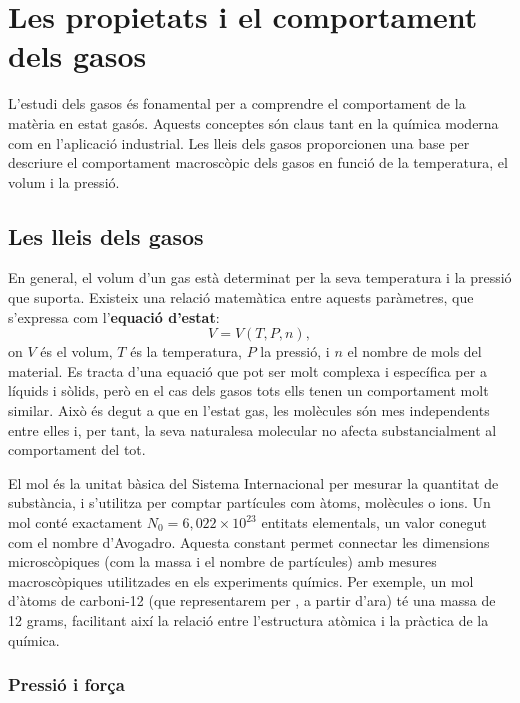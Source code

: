 \chapter{Les propietats i el comportament dels gasos}

L'estudi dels gasos és fonamental per a comprendre el comportament de la matèria en estat gasós. Aquests conceptes són claus tant en la química moderna com en l'aplicació industrial. Les lleis dels gasos proporcionen una base per descriure el comportament macroscòpic dels gasos en funció de la temperatura, el volum i la pressió.



\section{Les lleis dels gasos}
En general, el volum d'un gas està determinat per la seva temperatura i la pressió que suporta. Existeix una relació matemàtica entre aquests paràmetres, que s'expressa com l'\textbf{equació d'estat}:
\begin{equation}
V = V(T, P, n),
\end{equation}
on $V$ és el volum, $T$ és la temperatura, $P$ la pressió, i $n$ el nombre de mols del material. Es tracta d'una equació que pot ser molt complexa i específica per a líquids i sòlids, però en el cas dels gasos tots ells tenen un comportament molt similar. Això és degut a que en l'estat gas, les molècules són mes independents entre elles i, per tant, la seva naturalesa molecular no afecta substancialment al comportament del tot.

\begin{mybox}[title=De partícules i mols de partícules]
    El mol és la unitat bàsica del Sistema Internacional per mesurar la quantitat de substància, i s'utilitza per comptar partícules com àtoms, molècules o ions. Un mol conté exactament \(N_0=6,022 \times 10^{23}\) entitats elementals, un valor conegut com el nombre d'Avogadro. Aquesta constant permet connectar les dimensions microscòpiques (com la massa i el nombre de partícules) amb mesures macroscòpiques utilitzades en els experiments químics. Per exemple, un mol d'àtoms de carboni-12 (que representarem per , a partir d'ara) té una massa de 12 grams, facilitant així la relació entre l'estructura atòmica i la pràctica de la química.
\end{mybox}
    
\subsection{Pressió i força}

